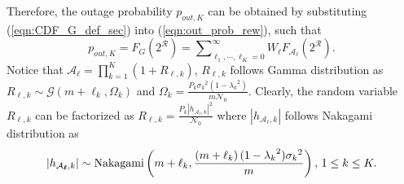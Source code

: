 \documentclass[12pt,onecolumn,draftcls]{IEEEtran}
\newcommand{\bs}{\boldsymbol}
\newtheorem{remark}{Remark}
\begin{document}
Therefore, the outage probability ${p_{out,K}}$ can be obtained by substituting (\ref{eqn:CDF_G_def_sec}) into (\ref{eqn:out_prob_rew}), such that
\begin{equation}\label{eqn:out_prob_def_hat}
{p_{out,K}} = {F_{ G}}\left( {{2^{\mathcal R}} } \right) = \sum\nolimits_{{\ell_1}, \cdots ,{\ell_K} = 0}^\infty  {{W_{\bs{\ell}}}{F_{{{ {\mathcal A}}_{\bs{\ell}}}}}(2^{\mathcal R})}.
\end{equation}
Notice that $\mathcal A_{\bs{\ell}} = \prod\nolimits_{k = 1}^K (1+R_{{\bs{\ell}},k})$, $R_{{\bs{\ell}},k}$ follows Gamma distribution as $R_{{\bs{\ell}},k} \sim \mathcal {G}(m+\ell_k,{\Omega _k})$ and $\Omega _k = \frac{{P_k}{\sigma _k}^2\left( {1 - {\lambda _k}^2} \right)}{m\mathcal N_0}$. Clearly, the random variable $R_{{\bs{\ell}},k}$ can be factorized as $R_{{\bs{\ell}},k} = \frac{P_k\left| {{h_{{{\mathcal A}_{\bs{\ell}}},k}}} \right|^2}{\mathcal N_0}$ where $\left| {{h_{{{\mathcal A}_{\bs{\ell}}},k}}} \right|$ follows Nakagami distribution as
\begin{equation}\label{eqn:channel_coeff_dec}
\left| {{h_{{{\mathcal A}_{\bs{\ell}}},k}}} \right| \sim {\rm Nakagami}\left( {m + {\ell_k},\frac{\left( {m + {\ell_k}} \right)(1-{\lambda_k}^2){\sigma_k}^2}{m}} \right),\, 1 \le k \le K.
\end{equation}
\end{document}
